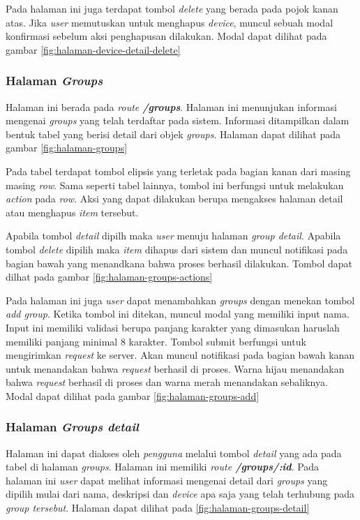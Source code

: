 Pada halaman ini juga terdapat tombol \textit{delete} yang berada pada pojok kanan atas. Jika \textit{user} memutuskan untuk menghapus \textit{device}, muncul sebuah modal konfirmasi sebelum aksi penghapusan dilakukan. Modal dapat dilihat pada gambar \ref{fig:halaman-device-detail-delete}

\subsubsection{Halaman \textit{Groups}}
Halaman ini berada pada \textit{route \textbf{/groups}}. Halaman ini menunjukan informasi mengenai \textit{groups} yang telah terdaftar pada sistem. Informasi ditampilkan dalam bentuk tabel yang berisi detail dari objek \textit{groups}. Halaman dapat dilihat pada gambar \ref{fig:halaman-groups}

Pada tabel terdapat tombol elipsis yang terletak pada bagian kanan dari masing masing \textit{row}. Sama seperti tabel lainnya, tombol ini berfungsi untuk melakukan \textit{action} pada \textit{row}. Aksi yang dapat dilakukan berupa mengakses halaman detail atau menghapus \textit{item} tersebut.

Apabila tombol \textit{detail} dipilh maka \textit{user} menuju halaman \textit{group detail}. Apabila tombol \textit{delete} dipilih maka \textit{item} dihapus dari sistem dan muncul notifikasi pada bagian bawah yang menandkana bahwa proses berhasil dilakukan. Tombol dapat dilhat pada gambar \ref{fig:halaman-groups-actions}

Pada halaman ini juga \textit{user} dapat menambahkan \textit{groups} dengan menekan tombol \textit{add group}. Ketika tombol ini ditekan, muncul modal yang memiliki input nama. Input ini memiliki validasi berupa panjang karakter yang dimasukan haruslah memiliki panjang minimal 8 karakter. Tombol submit berfungsi untuk mengirimkan \textit{request} ke server. Akan muncul notifikasi pada bagian bawah kanan untuk menandakan bahwa \textit{request} berhasil di proses. Warna hijau menandakan bahwa \textit{request} berhasil di proses dan warna merah menandakan sebaliknya. Modal dapat dilihat pada gambar \ref{fig:halaman-groups-add}

\subsubsection{Halaman \textit{Groups detail}}
Halaman ini dapat diakses oleh \textit{pengguna} melalui tombol \textit{detail} yang ada pada tabel di halaman \textit{groups}. Halaman ini memiliki \textit{route \textbf{/groups/:id}}. Pada halaman ini \textit{user} dapat melihat informasi mengenai detail dari \textit{groups} yang dipilih mulai dari nama, deskripsi dan \textit{device} apa saja yang telah terhubung pada \textit{group tersebut}. Halaman dapat dilihat pada \ref{fig:halaman-groups-detail}


